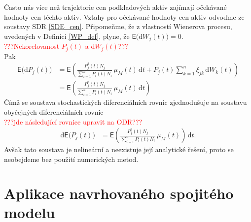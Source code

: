 \documentclass[a4paper,12pt]{report}
\theoremstyle{definition} \newtheorem{definice}[veta]{Definice}
\theoremstyle{remark}
\begin{document}
Často nás více než trajektorie cen podkladových aktiv zajímají očekávané hodnoty cen těchto aktiv.
Vztahy pro očekávané hodnoty cen aktiv odvoďme ze soustavy SDR \eqref{SDE_cen}.
Připomeňme, že z vlastností Wienerova procesu, uvedených v Definici \ref{WP_def}, plyne, že $\mathsf{E}\big(\mathrm{d}W_j(t)\big)=0$.
\\
\textcolor{red}{???Nekorelovanost $P_j(t)$ a $\mathrm{d}W_j(t)$???}
\\
Pak
\begin{align*}%
\mathsf{E}\big( \mathrm{d}P_j(t)\big)&	=\mathsf{E}\left(\frac{P_j^2(t)N_j}{\sum_{i=1}^n P_i(t)N_i}\, \mu_M(t)\,\mathrm{d}t+P_j(t)\sum_{k=1}^{n}\xi_{jk}\,\mathrm{d}W_k(t)\right)\\
&=\mathsf{E}\left(\frac{P_j^2(t)N_j}{\sum_{i=1}^n P_i(t)N_i}\, \mu_M(t)\,\mathrm{d}t\right)
\end{align*}
Čímž se soustava stochastických diferenciálních rovnic zjednodušuje na soustavu obyčejných diferenciálních rovnic
\\
\textcolor{red}{???jde následující rovnice upravit na ODR???}
\\
\begin{align*}
\mathrm{d}\mathsf{E}\big(P_j(t)\big)&=\mathsf{E}\left(\frac{P_j^2(t)N_j}{\sum_{i=1}^n P_i(t)N_i}\, \mu_M(t)\right)\,\mathrm{d}t.
\end{align*}
Avšak tato soustava je nelineární a neexistuje její analytické řešení, proto se neobejdeme bez použití numerických metod.


\section{Aplikace navrhovaného spojitého modelu}\label{aplikace}
\end{document}

